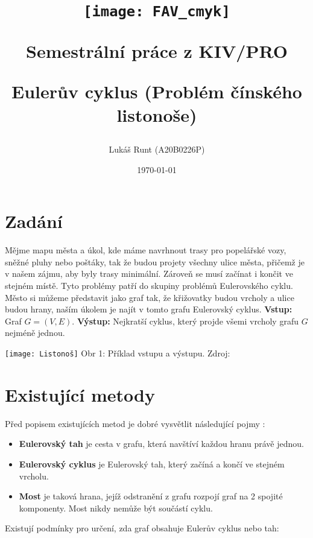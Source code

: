\documentclass[12pt]{article}
\title{\texttt{[image: FAV\_cmyk]}

{\huge Semestrální práce z KIV/PRO}

\vspace{0.5cm}
{\LARGE Eulerův cyklus (Problém čínského listonoše)}
\vspace{1cm}
}
\author{Lukáš Runt (A20B0226P)}
\date{\vspace{7.5cm} \today}
\begin{document}
\begin{titlepage}
\clearpage\maketitle
\thispagestyle{empty}
\end{titlepage}

\tableofcontents
\newpage
\section{Zadání}
Mějme mapu města a úkol, kde máme navrhnout trasy pro popelářské vozy, sněžné pluhy nebo poštáky, tak že budou projety všechny ulice města, přičemž je v našem zájmu, aby byly trasy minimální. Zároveň se musí začínat i končit ve stejném místě. Tyto problémy patří do skupiny problémů Eulerovského cyklu. Město si můžeme představit jako graf tak, že křižovatky budou vrcholy a ulice budou hrany, naším úkolem je najít v tomto grafu Eulerovský cyklus.
\vspace{0.5cm}
\newline\textbf{Vstup:} Graf $G = (V, E)$.
\vspace{0.5cm}
\newline\textbf{Výstup:} Nejkratší cyklus, který projde všemi vrcholy grafu $G$ nejméně jednou.
\begin{center}
	\texttt{[image: Listonoš]}
	\newline Obr 1: Příklad vstupu a výstupu. Zdroj: \cite{skiena1998algorithm}
\end{center}
\section{Existující metody}
Před popisem existujících metod je dobré vysvětlit následující pojmy \cite{Fleury}:
\begin{itemize}
\item \textbf{Eulerovský tah} je cesta v grafu, která navštíví každou hranu právě jednou.
\item \textbf{Eulerovský cyklus} je Eulerovský tah, který začíná a končí ve stejném vrcholu.
\item \textbf{Most} je taková hrana, jejíž odstranění z grafu rozpojí graf na 2 spojité komponenty. Most nikdy nemůže být součástí cyklu.
\end{itemize}
\newpage Existují podmínky pro určení, zda graf obsahuje Eulerův cyklus nebo tah:
\end{document}
